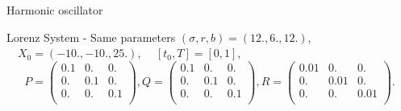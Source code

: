 \begin{frame}{Harmonic oscillator}
\begin{minipage}{.32\linewidth}
       \end{minipage}
       
   \end{frame}
   \begin{frame}{Lorenz System - Same parameters}
       $(\sigma, r, b)=(12.,6.,12.)$, $\quad X_0=(-10.,-10.,25.)$, $\quad [t_0,T]=[0,1]$,
       $$P=\begin{pmatrix}
       0.1 & 0. & 0. \\
       0. & 0.1 & 0. \\
       0. & 0. & 0.1 \\
       \end{pmatrix} ,
       Q=\begin{pmatrix}
       0.1 & 0. & 0. \\
       0. & 0.1 & 0. \\
       0. & 0. & 0.1 \\
       \end{pmatrix},
       R=\begin{pmatrix}
       0.01 & 0. & 0. \\
       0. & 0.01 & 0. \\
       0. & 0. & 0.01 \\
       \end{pmatrix}.$$ 
       
    \end{frame}
